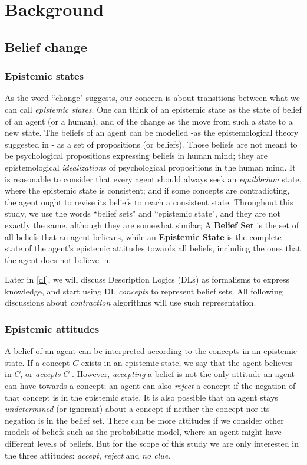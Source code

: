 \chapter{Background}
\section{Belief change}
\subsection{Epistemic states}
As the word ``change" suggests, our concern is about transitions between what we can call \textit{epistemic states}. One can think of an epistemic state as the state of belief of an agent (or a human), and of the change as the move from such a state to a new state. The beliefs of an agent can be modelled -as the epistemological theory suggested in \cite{flux}- as a set of propositions (or beliefs). Those beliefs are not meant to be psychological propositions expressing beliefs in human mind; they are epistemological \textit{idealizations} of psychological propositions in the human mind. It is reasonable to consider that every agent should always seek an \textit{equilibrium} state, where the epistemic state is consistent; and if some concepts are contradicting, the agent ought to revise its beliefs to reach a consistent state. Throughout this study, we use the words ``belief sets" and ``epistemic state", and they are not exactly the same, although they are somewhat similar; A \textbf{Belief Set} is the set of all beliefs that an agent believes, while an \textbf{Epistemic State} is the complete state of the agent's epistemic attitudes towards all beliefs, including the ones that the agent does not believe in.

Later in \ref{dl}, we will discuss Description Logics (DLs) as formalisms to express knowledge, and start using DL \textit{concepts} to represent belief sets. All following discussions about \textit{contraction} algorithms will use such representation.


\subsection{Epistemic attitudes}
A belief of an agent can be interpreted according to the concepts in an epistemic state. If a concept $C$ exists in an epistemic state, we say that the agent believes in $C$, or \textit{accepts} $C$ \cite{flux}. However, \textit{accepting} a belief is not the only attitude an agent can have towards a concept; an agent can also \textit{reject} a concept if the negation of that concept is in the epistemic state. It is also possible that an agent stays \textit{undetermined} (or ignorant) about a concept if neither the concept nor its negation is in the belief set. There can be more attitudes if we consider other models of beliefs such as the probabilistic model, where an agent might have different levels of beliefs. But for the scope of this study we are only interested in the three attitudes: \textit{accept}, \textit{reject} and \textit{no clue}.
